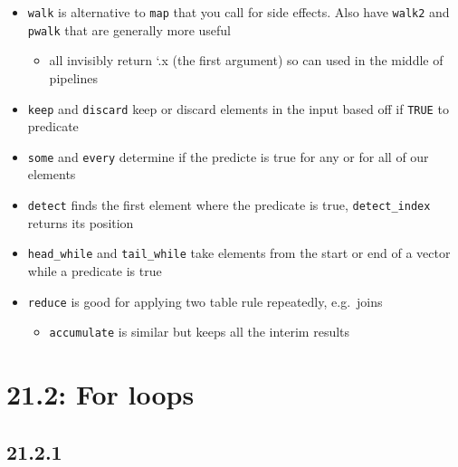 \documentclass[]{book}
\providecommand{\tightlist}{%
  \setlength{\itemsep}{0pt}\setlength{\parskip}{0pt}}
\theoremstyle{definition}
\theoremstyle{definition}
\theoremstyle{definition}
\theoremstyle{remark}
\begin{document}
\begin{itemize}
\tightlist
\item
  \texttt{walk} is alternative to \texttt{map} that you call for side
  effects. Also have \texttt{walk2} and \texttt{pwalk} that are
  generally more useful

  \begin{itemize}
  \tightlist
  \item
    all invisibly return `.x (the first argument) so can used in the
    middle of pipelines
  \end{itemize}
\item
  \texttt{keep} and \texttt{discard} keep or discard elements in the
  input based off if \texttt{TRUE} to predicate
\item
  \texttt{some} and \texttt{every} determine if the predicte is true for
  any or for all of our elements
\item
  \texttt{detect} finds the first element where the predicate is true,
  \texttt{detect\_index} returns its position
\item
  \texttt{head\_while} and \texttt{tail\_while} take elements from the
  start or end of a vector while a predicate is true
\item
  \texttt{reduce} is good for applying two table rule repeatedly,
  e.g.~joins

  \begin{itemize}
  \tightlist
  \item
    \texttt{accumulate} is similar but keeps all the interim results
  \end{itemize}
\end{itemize}

\hypertarget{for-loops}{%
\section{21.2: For loops}\label{for-loops}}

\hypertarget{section-72}{%
\subsection{21.2.1}\label{section-72}}
\end{document}
